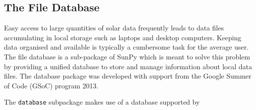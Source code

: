 \subsection{The File Database}\label{ssec:db}

Easy access to large quantities of solar data frequently leads to data files accumulating
in local storage such as laptops and desktop computers. Keeping data organised and available
is typically a cumbersome task for the average user. The file database is a sub-package of 
SunPy which is meant to solve this problem by providing a unified database to store and 
manage information about local data files. The database package was developed with support from 
the Google Summer of Code (GSoC) program 2013.

The \texttt{database} subpackage makes use of a database supported by
